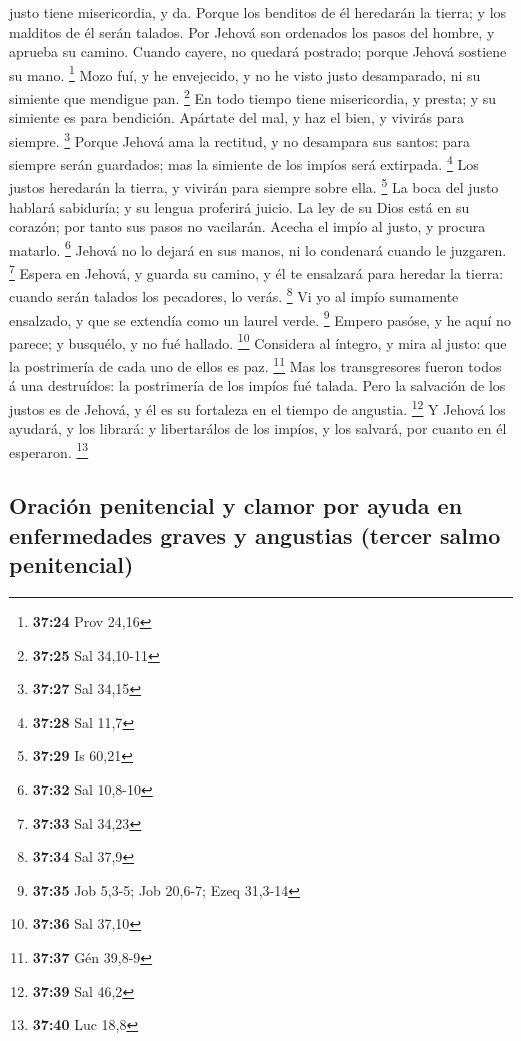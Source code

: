 justo tiene misericordia, y da.  Porque los benditos de él
heredarán la tierra; y los malditos de él serán talados. 
Por Jehová son ordenados los pasos del hombre, y aprueba su camino.
 Cuando cayere, no quedará postrado; porque Jehová sostiene
su mano. \footnote{\textbf{37:24} Prov 24,16}  Mozo fuí, y
he envejecido, y no he visto justo desamparado, ni su simiente que
mendigue pan. \footnote{\textbf{37:25} Sal 34,10-11}  En
todo tiempo tiene misericordia, y presta; y su simiente es para
bendición.  Apártate del mal, y haz el bien, y vivirás para
siempre. \footnote{\textbf{37:27} Sal 34,15}  Porque Jehová
ama la rectitud, y no desampara sus santos: para siempre serán
guardados; mas la simiente de los impíos será extirpada. \footnote{\textbf{37:28}
  Sal 11,7}  Los justos heredarán la tierra, y vivirán para
siempre sobre ella. \footnote{\textbf{37:29} Is 60,21}  La
boca del justo hablará sabiduría; y su lengua proferirá juicio.
 La ley de su Dios está en su corazón; por tanto sus pasos
no vacilarán.  Acecha el impío al justo, y procura matarlo.
\footnote{\textbf{37:32} Sal 10,8-10}  Jehová no lo dejará
en sus manos, ni lo condenará cuando le juzgaren. \footnote{\textbf{37:33}
  Sal 34,23}  Espera en Jehová, y guarda su camino, y él te
ensalzará para heredar la tierra: cuando serán talados los pecadores, lo
verás. \footnote{\textbf{37:34} Sal 37,9}  Vi yo al impío
sumamente ensalzado, y que se extendía como un laurel verde. \footnote{\textbf{37:35}
  Job 5,3-5; Job 20,6-7; Ezeq 31,3-14}  Empero pasóse, y he
aquí no parece; y busquélo, y no fué hallado. \footnote{\textbf{37:36}
  Sal 37,10}  Considera al íntegro, y mira al justo: que la
postrimería de cada uno de ellos es paz. \footnote{\textbf{37:37} Gén
  39,8-9}  Mas los transgresores fueron todos á una
destruídos: la postrimería de los impíos fué talada.  Pero
la salvación de los justos es de Jehová, y él es su fortaleza en el
tiempo de angustia. \footnote{\textbf{37:39} Sal 46,2}  Y
Jehová los ayudará, y los librará: y libertarálos de los impíos, y los
salvará, por cuanto en él esperaron. \footnote{\textbf{37:40} Luc 18,8}

\hypertarget{oraciuxf3n-penitencial-y-clamor-por-ayuda-en-enfermedades-graves-y-angustias-tercer-salmo-penitencial}{%
\subsection{Oración penitencial y clamor por ayuda en enfermedades
graves y angustias (tercer salmo
penitencial)}\label{oraciuxf3n-penitencial-y-clamor-por-ayuda-en-enfermedades-graves-y-angustias-tercer-salmo-penitencial}}

